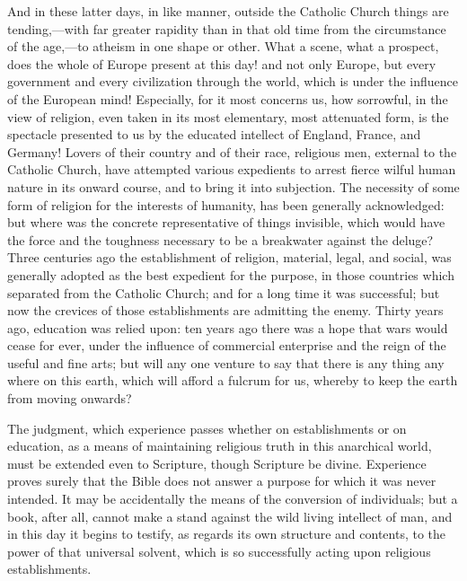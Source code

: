 And in these latter days, in like manner, outside the Catholic Church
things are tending,—with far greater rapidity than in that old
time from the circumstance of the age,—to atheism in one shape
or other. What a scene, what a prospect, does the whole of Europe
present at this day! and not only Europe, but every government and every
civilization through the world, which is under the influence of the
European mind! Especially, for it most concerns us, how sorrowful, in
the view of religion, even taken in its most elementary, most attenuated
form, is the spectacle presented to us by the educated intellect of
England, France, and Germany! Lovers of their country and of their race,
religious men, external to the Catholic Church, have attempted various
expedients to arrest fierce wilful human nature in its onward course,
and to bring it into subjection. The necessity of some form of religion
for the interests of humanity, has been generally acknowledged: but
where was the concrete representative of things invisible, which would
have the force and the toughness necessary to be a breakwater against
the deluge? Three centuries ago the establishment of religion, material,
legal, and social, was generally adopted as the best expedient for the
purpose, in those countries which separated from the Catholic Church;
and for a long time it was successful; but now the crevices of
those establishments are admitting the enemy. Thirty years ago,
education was relied upon: ten years ago there was a hope that wars
would cease for ever, under the influence of commercial enterprise and
the reign of the useful and fine arts; but will any one venture to say
that there is any thing any where on this earth, which will afford a
fulcrum for us, whereby to keep the earth from moving onwards?

The judgment, which experience passes whether on
establishments or on education, as a means of maintaining
religious truth in this anarchical world, must be extended even to
Scripture, though Scripture be divine. Experience proves surely that the
Bible does not answer a purpose for which it was never intended. It
may be accidentally the means of the conversion of individuals; but a
book, after all, cannot make a stand against the wild living intellect
of man, and in this day it begins to testify, as regards its own
structure and contents, to the power of that universal solvent, which is
so successfully acting upon religious establishments.


